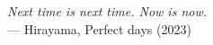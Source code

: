 \cleardoublepage
{}
\thispagestyle{empty}

\vspace*{3cm}

\begin{center}
    \textit{Next time is next time. Now is now.} \\ \medskip
    --- Hirayama, Perfect days (2023)
\end{center}

\medskip
